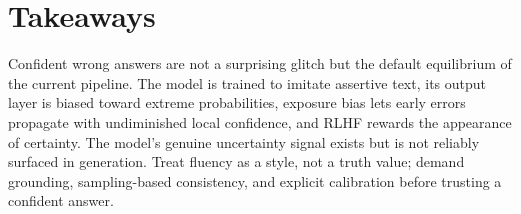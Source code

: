 \documentclass[11pt]{article}
\begin{document}
\section{Takeaways}
Confident wrong answers are not a surprising glitch but the default equilibrium of the current pipeline. The model is trained to imitate assertive text, its output layer is biased toward extreme probabilities, exposure bias lets early errors propagate with undiminished local confidence, and RLHF rewards the appearance of certainty. The model's genuine uncertainty signal exists but is not reliably surfaced in generation. Treat fluency as a style, not a truth value; demand grounding, sampling-based consistency, and explicit calibration before trusting a confident answer.



\end{document}
